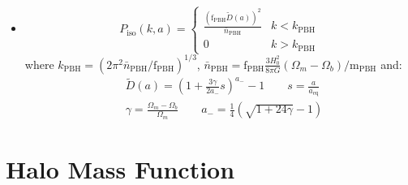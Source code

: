 \documentclass{article}
\begin{document}
\begin{itemize}
\begin{equation}
    \end{equation}
    \item 
    \begin{equation}
        P_{\text{iso}}(k,a) = 
        \begin{cases}
            \frac{(\text{f}_{\text{PBH}}\tilde{D}(a))^2}{\bar{n}_{\text{PBH}}} & k < k_{\text{PBH}} \\
            0 & k > k_{\text{PBH}} 
        \end{cases}
    \end{equation}
    where $k_{\text{PBH}} = (2\pi^2 \bar{n}_{\text{PBH}}/\text{f}_{\text{PBH}})^{1/3}$, $\bar{n}_{\text{PBH}}=\text{f}_{\text{PBH}}\frac{3H_0^2}{8\pi G}(\Omega_m-\Omega_b)/\text{m}_{\text{PBH}}$ and:
    \begin{equation}
        \begin{split}
            & \tilde{D}(a) = \left(1+\frac{3\gamma}{2a_-}s\right)^{a_-} - 1 \qquad s=\frac{a}{a_{\text{eq}}}\\
            & \gamma = \frac{\Omega_m - \Omega_b}{\Omega_m} \qquad a_- = \frac{1}{4}(\sqrt{1+24\gamma}-1)
        \end{split}
    \end{equation}
    \end{itemize}

\newpage
\section{Halo Mass Function}
\end{document}
